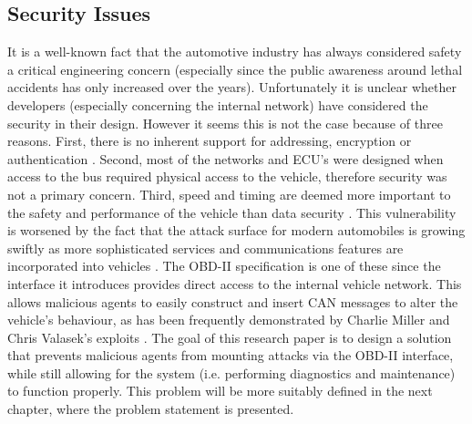 \subsection{Security Issues}
\label{subsec:obd:security_issues}

It is a well-known fact that the automotive industry has always considered safety a critical engineering concern (especially since the public awareness around lethal accidents has only increased over the years). Unfortunately it is unclear whether developers (especially concerning the internal network) have considered the security in their design. However it seems this is not the case because of three reasons. First, there is no inherent support for addressing, encryption or authentication \cite{MillerB}. Second, most of the networks and ECU's were designed when access to the bus required physical access to the vehicle, therefore security was not a primary concern. Third, speed and timing are deemed more important to the safety and performance of the vehicle than data security \cite{Klinedinst05}. This vulnerability is worsened by the fact that the attack surface for modern automobiles is growing swiftly as more sophisticated services and communications features are incorporated into vehicles \cite{Kosher}. The OBD-II specification is one of these since the interface it introduces provides direct access to the internal vehicle network. This allows malicious agents to easily construct and insert CAN messages to alter the vehicle's behaviour, as has been frequently demonstrated by Charlie Miller and Chris Valasek's exploits \cite{MillerA}\cite{MillerB}\cite{MillerC}. The goal of this research paper is to design a solution that prevents malicious agents from mounting attacks via the OBD-II interface, while still allowing for the system (i.e. performing diagnostics and maintenance) to function properly. This problem will be more suitably defined in the next chapter, where the problem statement is presented.

